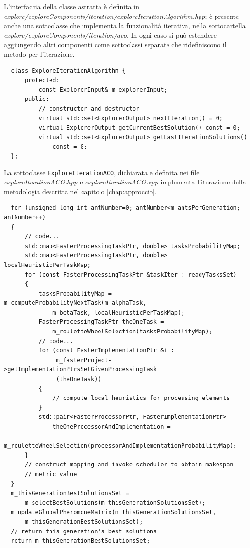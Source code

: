 L'interfaccia della classe astratta è definita in 
\emph{explore/exploreComponents/iteration/exploreIterationAlgorithm.hpp}; è 
presente anche una sottoclasse che implementa la funzionalità iterativa, nella 
sottocartella \emph{explore/exploreComponents/iteration/aco}. In ogni caso si 
può estendere aggiungendo altri componenti come sottoclassi separate che 
ridefiniscono il metodo per l'iterazione.
\newline
\begin{verbatim}
  class ExploreIterationAlgorithm {
      protected:
          const ExplorerInput& m_explorerInput;
      public:
          // constructor and destructor
          virtual std::set<ExplorerOutput> nextIteration() = 0;
          virtual ExplorerOutput getCurrentBestSolution() const = 0;
          virtual std::set<ExplorerOutput> getLastIterationSolutions()
              const = 0;
  };
\end{verbatim}

La sottoclasse \verb+ExploreIterationACO+, dichiarata e definita nei file
\emph{exploreIterationACO.hpp} e \emph{exploreIterationACO.cpp} implementa
l'iterazione della metodologia descritta nel capitolo \ref{chap:approccio}.
\newline
\begin{verbatim}
  for (unsigned long int antNumber=0; antNumber<m_antsPerGeneration; antNumber++)
  {
      // code...
      std::map<FasterProcessingTaskPtr, double> tasksProbabilityMap;
      std::map<FasterProcessingTaskPtr, double> localHeuristicPerTaskMap;
      for (const FasterProcessingTaskPtr &taskIter : readyTasksSet)
      {
          tasksProbabilityMap = m_computeProbabilityNextTask(m_alphaTask,
              m_betaTask, localHeuristicPerTaskMap);
          FasterProcessingTaskPtr theOneTask =
              m_rouletteWheelSelection(tasksProbabilityMap);
          // code...
          for (const FasterImplementationPtr &i :
               m_fasterProject->getImplementationPtrsSetGivenProcessingTask
               (theOneTask))
          {
              // compute local heuristics for processing elements
          }
          std::pair<FasterProcessorPtr, FasterImplementationPtr>
              theOneProcessorAndImplementation =
              m_rouletteWheelSelection(processorAndImplementationProbabilityMap);
      }
      // construct mapping and invoke scheduler to obtain makespan
      // metric value
  }
  m_thisGenerationBestSolutionsSet =
      m_selectBestSolutions(m_thisGenerationSolutionsSet);
  m_updateGlobalPheromoneMatrix(m_thisGenerationSolutionsSet,
      m_thisGenerationBestSolutionsSet);
  // return this generation's best solutions
  return m_thisGenerationBestSolutionsSet;
\end{verbatim}


